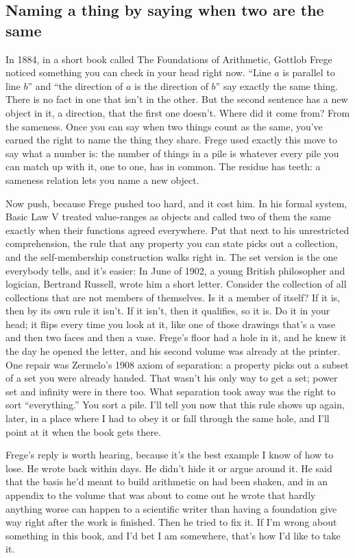 \documentclass[11pt,twoside]{article}
\theoremstyle{thielethm}
\theoremstyle{thieledef}
\theoremstyle{thieledef}
\theoremstyle{thieledef}
\theoremstyle{thielethm}
\theoremstyle{thieleobs}
\theoremstyle{thielethm}
\begin{document}
\subsection{Naming a thing by saying when two are the same}

In 1884, in a short book called The Foundations of Arithmetic, Gottlob Frege noticed something you can check in your head right now. ``Line $a$ is parallel to line $b$'' and ``the direction of $a$ is the direction of $b$'' say exactly the same thing. There is no fact in one that isn't in the other. But the second sentence has a new object in it, a direction, that the first one doesn't. Where did it come from? From the sameness. Once you can say when two things count as the same, you've earned the right to name the thing they share. Frege used exactly this move to say what a number is: the number of things in a pile is whatever every pile you can match up with it, one to one, has in common. The residue has teeth: a sameness relation lets you name a new object.

Now push, because Frege pushed too hard, and it cost him. In his formal system, Basic Law V treated value-ranges as objects and called two of them the same exactly when their functions agreed everywhere. Put that next to his unrestricted comprehension, the rule that any property you can state picks out a collection, and the self-membership construction walks right in. The set version is the one everybody tells, and it's easier: In June of 1902, a young British philosopher and logician, Bertrand Russell, wrote him a short letter. Consider the collection of all collections that are not members of themselves. Is it a member of itself? If it is, then by its own rule it isn't. If it isn't, then it qualifies, so it is. Do it in your head; it flips every time you look at it, like one of those drawings that's a vase and then two faces and then a vase. Frege's floor had a hole in it, and he knew it the day he opened the letter, and his second volume was already at the printer. One repair was Zermelo's 1908 axiom of separation: a property picks out a subset of a set you were already handed. That wasn't his only way to get a set; power set and infinity were in there too. What separation took away was the right to sort ``everything.'' You sort a pile. I'll tell you now that this rule shows up again, later, in a place where I had to obey it or fall through the same hole, and I'll point at it when the book gets there.

Frege's reply is worth hearing, because it's the best example I know of how to lose. He wrote back within days. He didn't hide it or argue around it. He said that the basis he'd meant to build arithmetic on had been shaken, and in an appendix to the volume that was about to come out he wrote that hardly anything worse can happen to a scientific writer than having a foundation give way right after the work is finished. Then he tried to fix it. If I'm wrong about something in this book, and I'd bet I am somewhere, that's how I'd like to take it.
\end{document}
